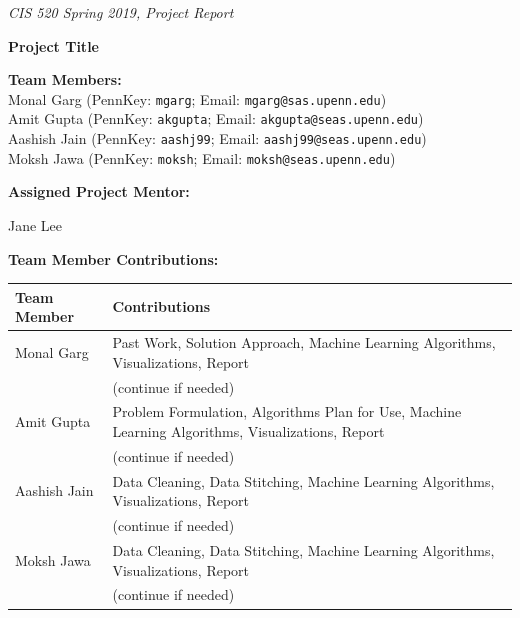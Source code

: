 \documentclass{article}
\begin{document}



\emph{\footnotesize{CIS 520 Spring 2019, Project Report}}


\vspace{12pt}

\textbf{\Large{Project Title}}

\vspace{1cm}

\textbf{Team Members:} \\
Monal Garg (PennKey: \texttt{mgarg}; Email: \texttt{mgarg@sas.upenn.edu}) \\
Amit Gupta (PennKey: \texttt{akgupta}; Email: \texttt{akgupta@seas.upenn.edu}) \\
Aashish Jain (PennKey: \texttt{aashj99}; Email: \texttt{aashj99@seas.upenn.edu}) \\
Moksh Jawa (PennKey: \texttt{moksh}; Email: \texttt{moksh@seas.upenn.edu})


\vspace{2cm}


\textbf{Assigned Project Mentor:}

Jane Lee

\vspace{1cm}

\textbf{Team Member Contributions:}

\begin{center}
\begin{tabular}{|l|l|}
\hline
Team Member & Contributions \\
\hline
Monal Garg & Past Work, Solution Approach, Machine Learning Algorithms, Visualizations, Report \\
  & (continue if needed) \\
\hline
Amit Gupta & Problem Formulation, Algorithms Plan for Use, Machine Learning Algorithms, Visualizations, Report \\
  & (continue if needed) \\
\hline
Aashish Jain & Data Cleaning, Data Stitching, Machine Learning Algorithms, Visualizations, Report \\
  & (continue if needed) \\
\hline
Moksh Jawa & Data Cleaning, Data Stitching, Machine Learning Algorithms, Visualizations, Report \\
  & (continue if needed) \\
\hline
\end{tabular}
\end{center}
\end{document}
